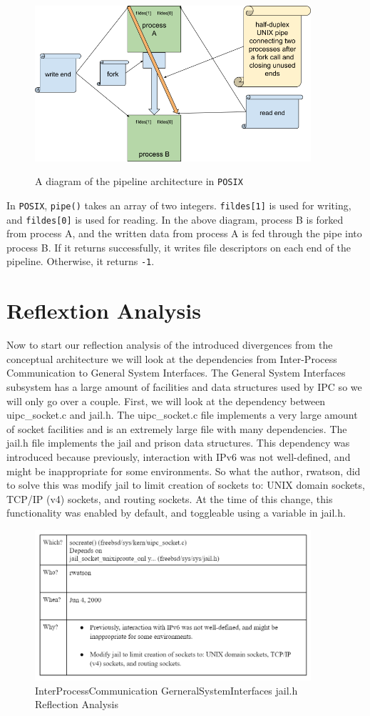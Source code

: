 \documentclass[12pt, dvipsnames, a4paper]{article}
\newcommand{\code}[1]{\texttt{#1}}
\begin{document}
\begin{figure}[hbt!]
	\centering
	\includegraphics[width=290pt]{assets/localipc2.png}
	\caption{A diagram of the pipeline architecture in \code{POSIX}} \cite{rytarowski}
\end{figure}

In \code{POSIX}, \code{pipe()} takes an array of two integers. \code{fildes[1]} is used for writing, and \code{fildes[0]} is used for reading. In the above diagram, process B is forked from process A, and the written data from process A is fed through the pipe into process B. If it returns successfully, it writes file descriptors on each end of the pipeline. Otherwise, it returns \code{-1}.

\section{Reflextion Analysis}
Now to start our reflection analysis of the introduced divergences from the conceptual architecture  we will look at the dependencies from Inter-Process Communication to General System Interfaces. The General System Interfaces subsystem has a large amount of facilities and data structures used by IPC so we will only go over a couple. First, we will look at the dependency between uipc\_socket.c and jail.h. The uipc\_socket.c file implements a very large amount of socket facilities and is an extremely large file with many dependencies. The jail.h file implements the jail and prison data structures. This dependency was introduced because previously, interaction with IPv6 was not well-defined, and might be inappropriate for some environments. So what the author, rwatson, did to solve this was modify jail to limit creation of sockets to: UNIX domain sockets, TCP/IP (v4) sockets, and routing sockets. At the time of this change, this functionality was enabled by default, and toggleable using a variable in jail.h. 
\clearpage
\begin{figure}
	\centering
	\includegraphics[width=290pt]{assets/IPC_Jail.png}
	\caption{InterProcessCommunication \-\> GerneralSystemInterfaces jail.h Reflection Analysis} 
\end{figure}
\end{document}
